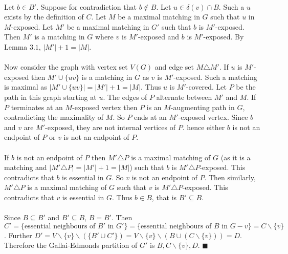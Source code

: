 \documentclass[letterpaper,12pt,oneside,onecolumn]{report}
\begin{document}
\paragraph{}
Let $b \in B'$. Suppose for contradiction that $b \not\in B$. Let $u \in \delta(v) \cap B$. Such a $u$ exists by the definition of $C$. Let $M$ be a maximal matching in $G$ such that $u$ in $M$-exposed. Let $M'$ be a maximal matching in $G'$ such that $b$ is $M'$-exposed. Then $M'$ is a matching in $G$ where $v$ is $M'$-exposed and $b$ is $M'$-exposed. By Lemma $3.1$, $|M'| + 1 = |M|$.
\paragraph{}
Now consider the graph with vertex set $V(G)$ and edge set $M \triangle M'$. If $u$ is $M'$-exposed then $M' \cup \{uv\}$ is a matching in $G$ as $v$ is $M'$-exposed. Such a matching is maximal as $|M' \cup \{uv\}| = |M'| + 1 = |M|$. Thus $u$ is $M'$-covered. Let $P$ be the path in this graph starting at $u$. The edges of $P$ alternate between $M'$ and $M$. If $P$ terminates at an $M$-exposed vertex then $P$ is an $M$-augmenting path in $G$, contradicting the maximality of $M$. So $P$ ends at an $M'$-exposed vertex. Since $b$ and $v$ are $M'$-exposed, they are not internal vertices of $P$. hence either $b$ is not an endpoint of $P$ or $v$ is not an endpoint of $P$.
\paragraph{}
If $b$ is not an endpoint of $P$ then $M' \triangle P$ is a maximal matching of $G$ (as it is a matching and $|M' \triangle P| = |M'| + 1 = |M|$) such that $b$ is $M' \triangle P$-exposed. This contradicts that $b$ is essential in $G$. So $v$ is not an endpoint of $P$. Then similarly, $M' \triangle P$ is a maximal matching of $G$ such that $v$ is $M' \triangle P$-exposed. This contradicts that $v$ is essential in $G$. Thus $b \in B$, that is $B' \subseteq B$.
\paragraph{}
Since $B \subseteq B'$ and $B' \subseteq B$, $B = B'$. Then $C' = \{ \text{essential neighbours of $B'$ in $G'$}\} = \{\text{essential neighbours of $B$ in $G-v$} \} = C \backslash \{ v \}$. Further $D' = V\backslash \{ v\} \backslash (\{ B' \cup C' \} ) = V\backslash \{ v\} \backslash (B \cup (C\backslash \{ v\} )) = D$. Therefore the Gallai-Edmonds partition of $G'$ is $B,C\backslash \{v\}, D$. $\blacksquare$ 
\end{document}
